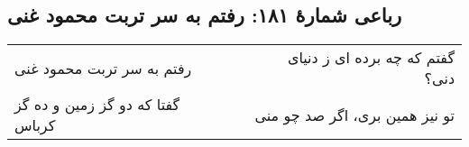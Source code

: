 \begin{center}
\section*{رباعی شمارهٔ ۱۸۱: رفتم به سر تربت محمود غنی}
\label{sec:181}
\begin{longtable}{l p{0.5cm} r}
رفتم به سر تربت محمود غنی
&&
گفتم که چه برده ای ز دنیای دنی؟
\\
گفتا که دو گز زمین و ده گز کرباس
&&
تو نیز همین بری، اگر صد چو منی
\\
\end{longtable}
\end{center}
